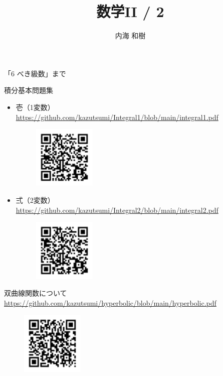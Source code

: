 \documentclass[10pt, uplatex, dvipdfmx]{jsarticle}
\title{\Huge 数学II / 2}
\author{\Large 内海 和樹}
\theoremstyle{definition}
\numberwithin{equation}{section}
\begin{document}
\maketitle

\begin{center}
  「6 べき級数」まで
\end{center}

\vspace{2zh}

\begin{center}
  {\LARGE 積分基本問題集}

  \begin{itemize}
    
  \item 壱（1変数） \url{https://github.com/kazutsumi/Integral1/blob/main/integral1.pdf}
    \begin{figure}[h]
      \centering
      \includegraphics[width=3cm]{./pictures/QR/1.png}
    \end{figure}
    
  \item 弍（2変数） \url{https://github.com/kazutsumi/Integral2/blob/main/integral2.pdf}
    \begin{figure}[h]
      \centering
      \includegraphics[width=3cm]{./pictures/QR/2.png}
    \end{figure}
  \end{itemize}

  \vspace{1zh}

  {\LARGE 双曲線関数について}
  \url{https://github.com/kazutsumi/hyperbolic/blob/main/hyperbolic.pdf}
      \begin{figure}[h]
      \centering
      \includegraphics[width=3cm]{./pictures/QR/hyperbolic.png}
    \end{figure}

\end{center}
\end{document}
